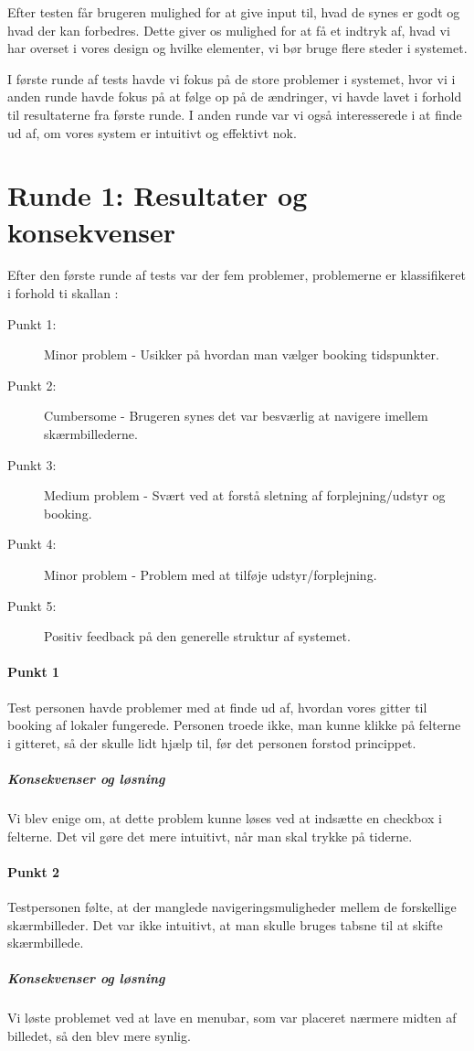 Efter testen får brugeren mulighed for at give input til, hvad de synes er godt og hvad der kan forbedres. Dette giver os mulighed for at få et indtryk af, hvad vi har overset i vores design og hvilke elementer, vi bør bruge flere steder i systemet.

I første runde af tests havde vi fokus på de store problemer i systemet, hvor vi i anden runde havde fokus på at følge op på de ændringer, vi havde lavet i forhold til resultaterne fra første runde. I anden runde var vi også interesserede i at finde ud af, om vores system er intuitivt og effektivt nok.

\section{Runde 1: Resultater og konsekvenser}
\label{Usability_R1}
Efter den første runde af tests var der fem problemer, problemerne er klassifikeret i forhold ti skallan \cite[s. 439]{SL_UID}:
\begin{description}
\item [Punkt 1:] Minor problem - Usikker på hvordan man vælger booking tidspunkter.
\item [Punkt 2:] Cumbersome - Brugeren synes det var besværlig at navigere imellem skærmbillederne.
\item [Punkt 3:] Medium problem - Svært ved at forstå sletning af forplejning/udstyr og booking.
\item [Punkt 4:] Minor problem - Problem med at tilføje udstyr/forplejning.
\item [Punkt 5:] Positiv feedback på den generelle struktur af systemet.
\end{description}

\paragraph{Punkt 1}
Test personen havde problemer med at finde ud af, hvordan vores gitter til booking af lokaler fungerede. Personen troede ikke, man kunne klikke på felterne i gitteret, så der skulle lidt hjælp til, før det personen forstod princippet.
\subparagraph{Konsekvenser og løsning}
Vi blev enige om, at dette problem kunne løses ved at indsætte en checkbox i felterne. Det vil gøre det mere intuitivt, når man skal trykke på tiderne.

\paragraph{Punkt 2}
Testpersonen følte, at der manglede navigeringsmuligheder mellem de forskellige skærmbilleder. Det var ikke intuitivt, at man skulle bruges tabsne til at skifte skærmbillede.
\subparagraph{Konsekvenser og løsning}
Vi løste problemet ved at lave en menubar, som var placeret nærmere midten af billedet, så den blev mere synlig.

